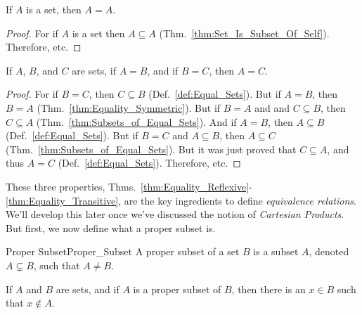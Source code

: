             \begin{theorem}
                \label{thm:Equality_Reflexive}%
                If $A$ is a set, then $A=A$.
            \end{theorem}
            \begin{proof}
                For if $A$ is a set then $A\subseteq{A}$
                (Thm.~\ref{thm:Set_Is_Subset_Of_Self}).
                Therefore, etc.
            \end{proof}
            \begin{theorem}
                \label{thm:Equality_Transitive}%
                If $A$, $B$, and $C$ are sets, if $A=B$, and if
                $B=C$, then $A=C$.
            \end{theorem}
            \begin{proof}
                For if $B=C$, then $C\subseteq{B}$
                (Def.~\ref{def:Equal_Sets}). But if
                $A=B$, then $B=A$
                (Thm.~\ref{thm:Equality_Symmetric}). But if
                $B=A$ and and $C\subseteq{B}$, then
                $C\subseteq{A}$
                (Thm.~\ref{thm:Subsets_of_Equal_Sets}).
                And if $A=B$, then $A\subseteq{B}$
                (Def.~\ref{def:Equal_Sets}). But if $B=C$ and
                $A\subseteq{B}$, then $A\subseteq{C}$
                (Thm.~\ref{thm:Subsets_of_Equal_Sets}). But it
                was just proved that $C\subseteq{A}$, and
                thus $A=C$ (Def.~\ref{def:Equal_Sets}).
                Therefore, etc.
            \end{proof}
            These three properties,
            Thms.~\ref{thm:Equality_Reflexive}-%
            \ref{thm:Equality_Transitive}, are the key
            ingredients to define \textit{equivalence relations}.
            We'll develop this later once we've discussed the
            notion of \textit{Cartesian Products}. But first, we
            now define what a proper subset is.
            \begin{ldefinition}{Proper Subset}{Proper_Subset}
                A \gls{proper subset} of a set $B$ is a
                subset $A$, denoted $A\subsetneq{B}$, such that
                $A\ne{B}$.
            \end{ldefinition}
            \begin{theorem}
                \label{thm:Prop_Subset_Not_Equal}%
                If $A$ and $B$ are sets, and if $A$ is a proper
                subset of $B$, then there is an $x\in{B}$ such
                that $x\notin{A}$.
            \end{theorem}
